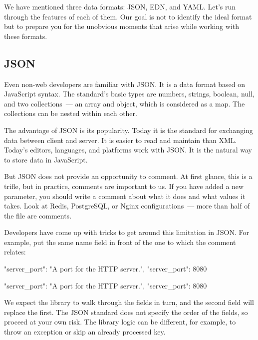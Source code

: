 We have mentioned three data formats: JSON, EDN, and YAML. Let's run through the features of each of them.  Our goal is not to identify the ideal format but to prepare you for the unobvious moments that arise while working with these formats.

\subsection{JSON}


Even non-web developers are familiar with JSON. It is a data format based on JavaScript syntax. The standard's basic types are numbers, strings, boolean, null, and two collections~--- an array and object, which is considered as a map. The collections can be nested within each other.


The advantage of JSON is its popularity. Today it is the standard for exchanging data between client and server.  It is easier to read and maintain than XML. Today's editors, languages, and platforms work with JSON. It is the natural way to store data in JavaScript.

But JSON does not provide an opportunity to comment. At first glance, this is a trifle, but in practice, comments are important to us. If you have added a new parameter, you should write a comment about what it does and what values it takes. Look at Redis, PostgreSQL, or Nginx configurations~--- more than half of the file are comments.

Developers have come up with tricks to get around this limitation in JSON.  For example, put the same name field in front of the one to which the comment relates:

\ifnarrow

\begin{json}
{
    "server_port":
    "A port for the HTTP server.",
    "server_port": 8080
}
\end{json}

\else

\begin{json}
{
    "server_port": "A port for the HTTP server.",
    "server_port": 8080
}
\end{json}

\fi

We expect the library to walk through the fields in turn, and the second field will replace the first. The JSON standard does not specify the order of the fields, so proceed at your own risk. The library logic can be different, for example, to throw an exception or skip an already processed key.


